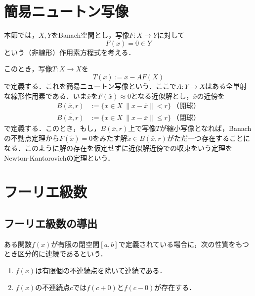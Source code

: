 \documentclass[11pt,a4paper,titlepage]{jsreport}
\theoremstyle{definition}
\newtheorem{thm}{定理}
\providecommand{\DIFdelbegin}{} %
\providecommand{\DIFdelend}{} %
\newcommand{\DIFscaledelfig}{0.5}
\newlength{\DIFdelgraphicswidth} %
\newlength{\DIFdelgraphicsheight} %
\newcommand{\DIFdelincludegraphics}[2][]{%
\sbox{\DIFdelgraphicsbox}{\DIFOincludegraphics[#1]{#2}}%
\settoboxwidth{\DIFdelgraphicswidth}{\DIFdelgraphicsbox} %
\settoboxtotalheight{\DIFdelgraphicsheight}{\DIFdelgraphicsbox} %
\scalebox{\DIFscaledelfig}{%
\parbox[b]{\DIFdelgraphicswidth}{\usebox{\DIFdelgraphicsbox}\\[-\baselineskip] \rule{\DIFdelgraphicswidth}{0em}}\llap{\resizebox{\DIFdelgraphicswidth}{\DIFdelgraphicsheight}{%
\setlength{\unitlength}{\DIFdelgraphicswidth}%
\begin{picture}(1,1)%
\thicklines\linethickness{2pt} %
{\color[rgb]{1,0,0}\put(0,0){\framebox(1,1){}}}%
{\color[rgb]{1,0,0}\put(0,0){\line( 1,1){1}}}%
{\color[rgb]{1,0,0}\put(0,1){\line(1,-1){1}}}%
\end{picture}%
}\hspace*{3pt}}} %
} %
\DeclareRobustCommand{\DIFdelbegin}{\DIFOdelbegin \let\includegraphics\DIFdelincludegraphics} %
\DeclareRobustCommand{\DIFdelend}{\DIFOaddend \let\includegraphics\DIFOincludegraphics} %
\begin{document}
\DIFdelbegin %

\DIFdelend \section{簡易ニュートン写像}
本節では，$X,Y$をBanach空間とし，写像$F:X\rightarrow Y$に対して
\begin{equation*}
  F(x)=0 \in Y
\end{equation*}
という（非線形）作用素方程式を考える．

このとき，写像$T:X\rightarrow X$を
\begin{equation*}
  T(x):=x-AF(X)
\end{equation*}
で定義する．これを簡易ニュートン写像という．ここで$A:Y\rightarrow X$はある全単射な線形作用素である．いま$\bar{x}$を$F(\bar{x})\approx 0$となる近似解とし，$\bar{x}$の近傍を
\begin{align*}
  B(\bar{x},r)            & :=\{x\in X\:\|x-\bar{x}\|<r\}\ （開球）     \\
  \overline{B(\bar{x},r)} & :=\{x\in X\:\|x-\bar{x}\|\leq r\}\ （閉球）
\end{align*}
で定義する．このとき，もし，$B(\bar{x},r)$上で写像$T$が縮小写像となれば，Banachの不動点定理から$F(\tilde{x})=0$をみたす解$\tilde{x}\in B(\bar{x},r)$がただ一つ存在することになる．このように解の存在を仮定せずに近似解近傍での収束をいう定理をNewton-Kantorovichの定理という．

\section{フーリエ級数}
\subsection{フーリエ級数の導出}
ある関数$f(x)$が有限の閉空間$[a,b]$で定義されている場合に，次の性質をもつとき区分的に連続であるという．
\begin{enumerate}
  \item $f(x)$は有限個の不連続点を除いて連続である．
  \item $f(x)$の不連続点$c$では$f(c+0)$と$f(c-0)$が存在する．
\end{enumerate}
\end{document}
